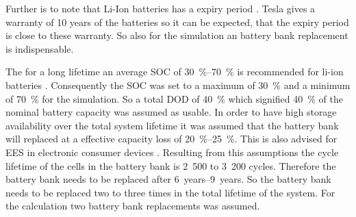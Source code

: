 Further is to note that Li-Ion batteries has a expiry period \cite{Jossen2006}. Tesla gives a warranty of 10 years of the batteries \cite{Shahan2015} so it can be expected, that the expiry period is close to these warranty. So also for the simulation an battery bank replacement is indispensable.



The for a long lifetime an average SOC of \SIrange{30}{70}{\percent} is recommended for li-ion batteries \cite{Jossen2006}. Consequently the SOC was set to a maximum of \SI{30}{\percent} and a minimum of \SI{70}{\percent} for the simulation. So a total DOD of \SI{40}{\percent} which signified \SI{40}{\percent} of the nominal battery capacity was assumed as usable. In order to have high storage availability over the total system lifetime it was assumed that the battery bank will replaced at a effective capacity loss of \SIrange{20}{25}{\percent}. This is also advised for EES in electronic consumer devices \cite{Spotnitz2003}. Resulting from this assumptions the cycle lifetime of the cells in the battery bank is 2~500 to 3~200 cycles. Therefore the battery bank needs to be replaced after \SIrange{6}{9}{years}. So the battery bank needs to be replaced two to three times in the total lifetime of the system. For the calculation two battery bank replacements was assumed. 

